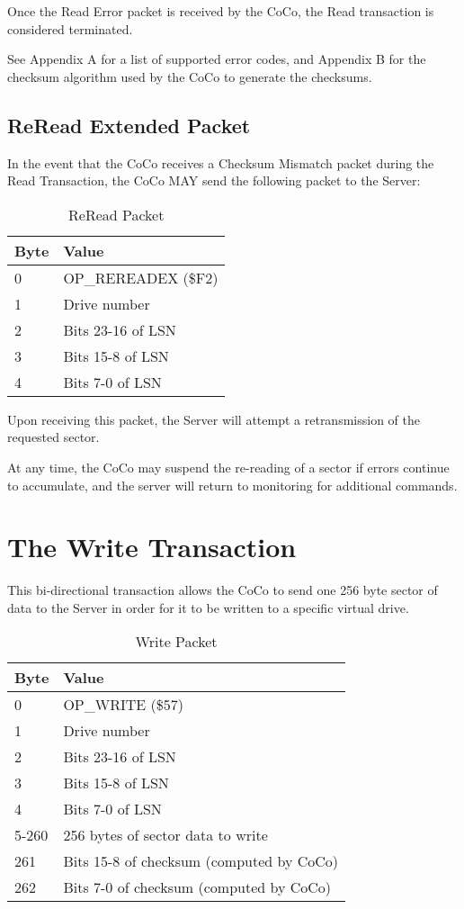 \documentclass{article}
\begin{document}
Once the Read Error packet is received by the CoCo, the Read transaction is considered terminated.

See Appendix A for a list of supported error codes, and Appendix B for the checksum algorithm used by the CoCo to generate the checksums.

\subsection{ReRead Extended Packet}
In the event that the CoCo receives a Checksum Mismatch packet during the Read Transaction, the CoCo MAY send the following packet to the Server:

\begin{table}[ht]
\caption{ReRead Packet}
\begin{center}
\begin{tabular}{|ll|}
\hline
Byte & Value \\ \hline
0 & OP\_REREADEX (\$F2) \\
1 & Drive number \\
2 & Bits 23-16 of LSN \\
3 & Bits 15-8 of LSN \\
4 & Bits 7-0 of LSN \\
\hline
\end{tabular}
\end{center}
\end{table}

Upon receiving this packet, the Server will attempt a retransmission of the requested sector.

At any time, the CoCo may suspend the re-reading of a sector if errors continue to accumulate, and the server will return to monitoring for additional commands.

\section{The Write Transaction}
This bi-directional transaction allows the CoCo to send one 256 byte sector of data to the Server in order for it to be written to a specific virtual drive.

\begin{table}[ht]
\caption{Write Packet}
\begin{center}
\begin{tabular}{|ll|}
\hline
Byte & Value \\ \hline
0 & OP\_WRITE (\$57) \\
1 & Drive number \\
2 & Bits 23-16 of LSN \\
3 & Bits 15-8 of LSN \\
4 & Bits 7-0 of LSN \\
5-260 & 256 bytes of sector data to write \\
261 & Bits 15-8 of checksum (computed by CoCo) \\
262 & Bits 7-0 of checksum (computed by CoCo) \\
\hline
\end{tabular}
\end{center}
\end{table}
\end{document}

